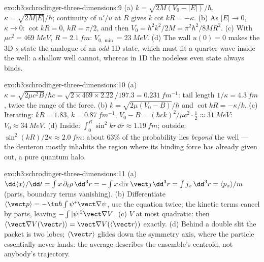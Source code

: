 \begin{solution}{exo:b3:schrodinger-three-dimensions:9}
(a) $k = \sqrt{2M(V_0 - |E|)}/\hbar$, $\kappa = \sqrt{2M|E|}/\hbar$;
continuity of $u'/u$ at $R$ gives $k\cot kR = -\kappa$. (b) As $|E|
\to 0$, $\kappa \to 0$: $\cot kR = 0$, $kR = \pi/2$, and then $V_0 =
\hbar^2k^2/2M = \pi^2\hbar^2/8MR^2$. (c) With $\mu c^2 =
\qty{469}{MeV}$, $R = \qty{2.1}{fm}$: $V_{0,\min} = \qty{23}{MeV}$.
(d) The wall $u(0) = 0$ makes the 3D $s$ state the analogue of an
\emph{odd} 1D state, which must fit a quarter wave inside the well:
a shallow well cannot, whereas in 1D the nodeless even state always
binds.
\end{solution}

\begin{solution}{exo:b3:schrodinger-three-dimensions:10}
(a) $\kappa = \sqrt{2\mu c^2B}/\hbar c = \sqrt{2 \times 469 \times
2.22}/197.3 = \qty{0.231}{fm^{-1}}$: tail length $1/\kappa =
\qty{4.3}{fm}$, twice the range of the force. (b) $k =
\sqrt{2\mu(V_0 - B)}/\hbar$ and $\cot kR = -\kappa/k$. (c) Iterating:
$kR = 1.83$, $k = \qty{0.87}{fm^{-1}}$, $V_0 - B = (\hbar ck)^2/\mu
c^2\cdot\tfrac12 \approx \qty{31}{MeV}$: $V_0 \approx \qty{34}{MeV}$.
(d) Inside: $\int_0^R\sin^2kr\,\dd r \approx \qty{1.19}{fm}$;
outside: $\sin^2(kR)/2\kappa \approx \qty{2.0}{fm}$: about $63\%$ of
the probability lies \emph{beyond} the well --- the deuteron mostly
inhabits the region where its binding force has already given out, a
pure quantum halo.
\end{solution}

\begin{solution}{exo:b3:schrodinger-three-dimensions:11}
(a) $\dd\langle x\rangle/\dd t = \int x\,\partial_t\rho\,\dd^3r =
-\int x\operatorname{div}\vect\jmath\,\dd^3r = \int j_x\,\dd^3r =
\langle p_x\rangle/m$ (parts, boundary terms vanishing). (b)
Differentiate $\langle\vect p\rangle = -\iu\hbar\int\psi^*\vect\nabla
\psi$, use the equation twice; the kinetic terms cancel by parts,
leaving $-\int|\psi|^2\vect\nabla V$. (c) $V$ at most quadratic:
then $\langle\vect\nabla V(\vect r)\rangle = \vect\nabla V(\langle
\vect r\rangle)$ exactly. (d) Behind a double slit the packet is two
lobes; $\langle\vect r\rangle$ glides down the symmetry axis, where
the particle essentially never lands: the average describes the
ensemble's centroid, not anybody's trajectory.
\end{solution}

